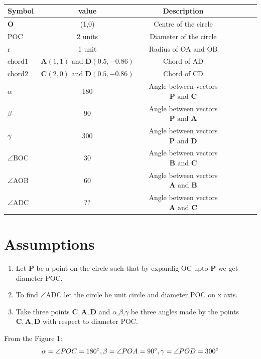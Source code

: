 \documentclass[12pt]{article}
\let\vec\mathbf
\begin{document}
\begin{table}[htbp]
 \begin{center}
    \begin{tabular}{|l|c|c|c|c|c|c} \hline \textbf{Symbol}
  & \textbf{value} & \textbf{Description} \\
 \hline
	    $\vec{O}$ &(1,0) & Centre of the circle\\ \hline
POC &2 units& Diameter of the circle\\ \hline
	 r &1 unit& Radius of OA and OB\\ \hline
	    chord1  &$\vec{A}(1,1) \text{ and } \vec{D}(0.5,-0.86)$ & Chord of AD \\ \hline
	    chord2  &$\vec{C}(2,0) \text{ and } \vec{D}(0.5,-0.86)$ & Chord of CD \\ \hline
	    $\alpha$ & 180\degree&Angle between vectors $\vec{P} \text{ and } \vec{C}$ \\ \hline
	    $\beta$ & 90\degree&Angle between vectors $\vec{P} \text{ and } \vec{A}$ \\ \hline
	    $\gamma$ & 300\degree&Angle between vectors $\vec{P} \text{ and } \vec{D}$ \\ \hline

	    $\angle$BOC &30\degree & Angle between vectors $\vec{B} \text{ and } \vec{C}$  \\ \hline
	    $\angle$AOB&60\degree&Angle between vectors $\vec{A} \text{ and } \vec{B}$\\
	\hline
	    $\angle$ADC&??&Angle between vectors $\vec{A} \text{ and } \vec{C}$ \\
	\hline
\end{tabular}   
\end{center}
\caption{\label{table:dummytable} }
\end{table}

\section*{\large Assumptions}
\begin{enumerate}
	\item Let $\vec{P}$ be a point on the circle such that by expandig OC upto $\vec{P}$ we get diameter POC.
\item To find $\angle$ADC let the circle be unit circle and diameter POC on x axis.
\item Take three points $\vec{C,A,D}$ and $\alpha$,$\beta$,$\gamma$ be three angles made by the points $\vec{C,A,D}$ with respect to diameter POC.
\end{enumerate}
From the Figure 1:
\begin{align}
\alpha = {\angle POC}= 180\degree, 
\beta= {\angle POA} = 90\degree,
\gamma = {\angle POD}=300\degree
\end{align}
\end{document}

